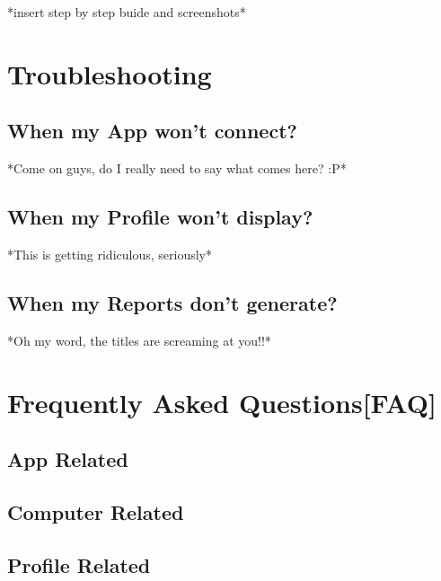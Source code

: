 \documentclass[11pt,fleqn]{book} %
\begin{document}
		*insert step by step buide and screenshots*



\chapter{Troubleshooting}
	\section{When my App won't connect?}
		*Come on guys, do I really need to say what comes here? :P*
	\section{When my Profile won't display?}
		*This is getting ridiculous, seriously*
	\section{When my Reports don't generate?}
		*Oh my word, the titles are screaming at you!!*


\chapter{Frequently Asked Questions[FAQ]}
	\section{App Related}
	\section{Computer Related}
	\section{Profile Related}
	
\end{document}
